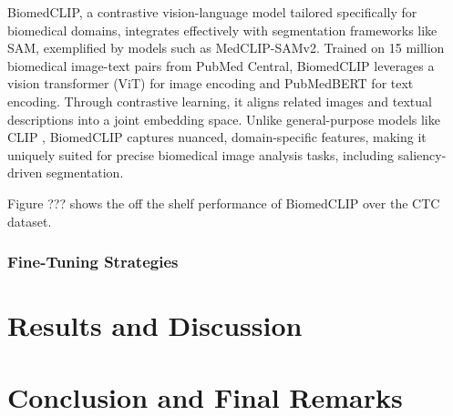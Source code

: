\documentclass[./dissertation.tex]{subfiles}
\begin{document}

BiomedCLIP, a contrastive vision-language model tailored specifically for biomedical domains, integrates effectively with segmentation frameworks like SAM, exemplified by models such as MedCLIP-SAMv2. Trained on 15 million biomedical image-text pairs from PubMed Central, BiomedCLIP leverages a vision transformer (ViT) for image encoding and PubMedBERT \cite{gu2021domain} for text encoding. Through contrastive learning, it aligns related images and textual descriptions into a joint embedding space. Unlike general-purpose models like CLIP \cite{radford2021learning}, BiomedCLIP captures nuanced, domain-specific features, making it uniquely suited for precise biomedical image analysis tasks, including saliency-driven segmentation.

Figure ??? shows the off the shelf performance of BiomedCLIP over the CTC dataset. 
\subsubsection{Fine-Tuning Strategies}




\section{Results and Discussion}

\section{Conclusion and Final Remarks}
\end{document}
